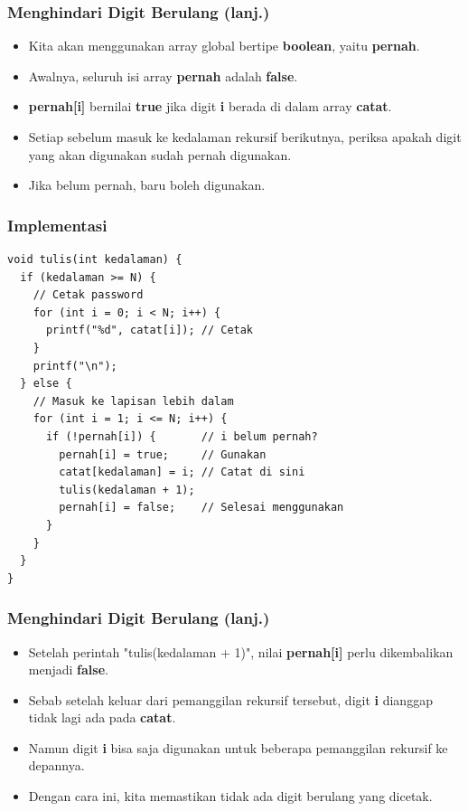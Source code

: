 \begin{frame}
\frametitle{Menghindari Digit Berulang (lanj.)}
\begin{itemize}
  \item Kita akan menggunakan array global bertipe \textbf{boolean}, yaitu \textbf{pernah}.
  \item Awalnya, seluruh isi array \textbf{pernah} adalah \textbf{false}.
  \item \textbf{pernah[i]} bernilai \textbf{true} jika digit \textbf{i} berada di dalam array \textbf{catat}.
  \item Setiap sebelum masuk ke kedalaman rekursif berikutnya, periksa apakah digit yang akan digunakan sudah pernah digunakan.
  \item Jika belum pernah, baru boleh digunakan.
\end{itemize}   
\end{frame}

\begin{frame}[fragile]
\frametitle{Implementasi}
\begin{lstlisting}
void tulis(int kedalaman) {
  if (kedalaman >= N) {
    // Cetak password
    for (int i = 0; i < N; i++) {
      printf("%d", catat[i]); // Cetak
    }
    printf("\n");
  } else {
    // Masuk ke lapisan lebih dalam
    for (int i = 1; i <= N; i++) {
      if (!pernah[i]) {       // i belum pernah?
        pernah[i] = true;     // Gunakan
        catat[kedalaman] = i; // Catat di sini
        tulis(kedalaman + 1);
        pernah[i] = false;    // Selesai menggunakan
      }
    }
  }
}
\end{lstlisting}
\end{frame}
  
\begin{frame}
\frametitle{Menghindari Digit Berulang (lanj.)}
\begin{itemize}
  \item Setelah perintah "tulis(kedalaman + 1)", nilai \textbf{pernah[i]} perlu dikembalikan menjadi \textbf{false}.
  \item Sebab setelah keluar dari pemanggilan rekursif tersebut, digit \textbf{i} dianggap tidak lagi ada pada \textbf{catat}.
  \item Namun digit \textbf{i} bisa saja digunakan untuk beberapa pemanggilan rekursif ke depannya.
  \item Dengan cara ini, kita memastikan tidak ada digit berulang yang dicetak.
\end{itemize}   
\end{frame}

